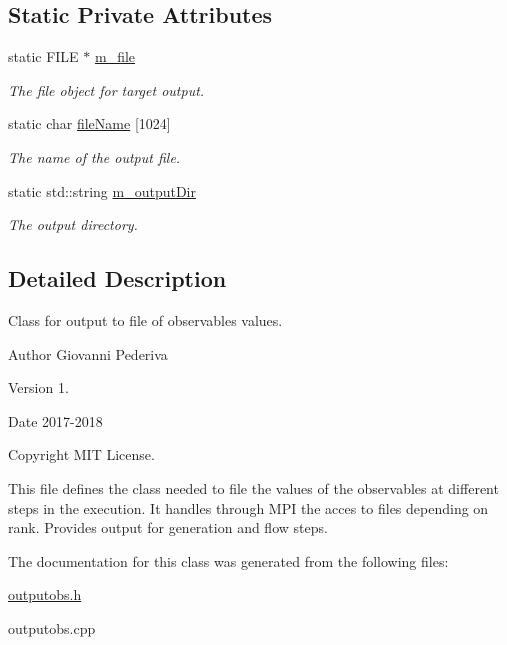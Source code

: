 \subsection*{Static Private Attributes}
\begin{DoxyCompactItemize}
\item 
static F\+I\+LE $\ast$ \hyperlink{classLatticeIO_1_1OutputObs_ad725efe02bfef0f70ef2a43722ce041d}{m\+\_\+file}\hypertarget{classLatticeIO_1_1OutputObs_ad725efe02bfef0f70ef2a43722ce041d}{}\label{classLatticeIO_1_1OutputObs_ad725efe02bfef0f70ef2a43722ce041d}

\begin{DoxyCompactList}\small\item\em The file object for target output. \end{DoxyCompactList}\item 
static char \hyperlink{classLatticeIO_1_1OutputObs_a451f0e835e3dfe2fc70cf779b73aae5d}{file\+Name} \mbox{[}1024\mbox{]}\hypertarget{classLatticeIO_1_1OutputObs_a451f0e835e3dfe2fc70cf779b73aae5d}{}\label{classLatticeIO_1_1OutputObs_a451f0e835e3dfe2fc70cf779b73aae5d}

\begin{DoxyCompactList}\small\item\em The name of the output file. \end{DoxyCompactList}\item 
static std\+::string \hyperlink{classLatticeIO_1_1OutputObs_a3ec9162c9ca9ddae173a1facbaa64a3a}{m\+\_\+output\+Dir}\hypertarget{classLatticeIO_1_1OutputObs_a3ec9162c9ca9ddae173a1facbaa64a3a}{}\label{classLatticeIO_1_1OutputObs_a3ec9162c9ca9ddae173a1facbaa64a3a}

\begin{DoxyCompactList}\small\item\em The output directory. \end{DoxyCompactList}\end{DoxyCompactItemize}


\subsection{Detailed Description}
Class for output to file of observables values. 

\begin{DoxyAuthor}{Author}
Giovanni Pederiva 
\end{DoxyAuthor}
\begin{DoxyVersion}{Version}
1. 
\end{DoxyVersion}
\begin{DoxyDate}{Date}
2017-\/2018 
\end{DoxyDate}
\begin{DoxyCopyright}{Copyright}
M\+IT License.
\end{DoxyCopyright}
This file defines the class needed to file the values of the observables at different steps in the execution. It handles through M\+PI the acces to files depending on rank. Provides output for generation and flow steps. 

The documentation for this class was generated from the following files\+:\begin{DoxyCompactItemize}
\item 
\hyperlink{outputobs_8h}{outputobs.\+h}\item 
outputobs.\+cpp\end{DoxyCompactItemize}
